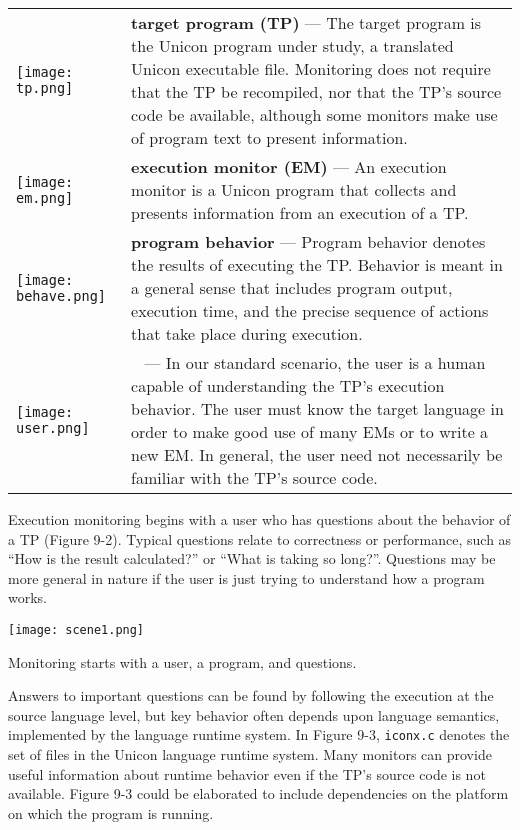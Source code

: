 \begin{tabular}{m{0.95in} m{4.75in}}
\texttt{[image: tp.png]} &
{\bf target program (TP)} ---
The target program is the Unicon program under study, a translated Unicon
executable file.
Monitoring does not require that the TP be recompiled, nor that
the TP's source code be available, although some monitors make use of
program text to present information. \index{target program!Alamo} \\
\texttt{[image: em.png]} &
{\bf execution monitor (EM)} ---
An execution monitor is a Unicon program that collects and presents
information from an execution of a TP. \index{execution monitor!Alamo} \\
\texttt{[image: behave.png]} &
{\bf program behavior} ---
Program behavior denotes the results of executing the TP.  Behavior is meant
in a general sense
that includes program output, execution time, and the precise sequence
of actions that take place during execution. \index{program behavior} \\
\texttt{[image: user.png]} &
\ \linebreak {\bf user} --- In our standard
scenario, the user is a human capable of understanding the TP's execution
behavior.  The user must know the target language in order to make good use
of many EMs or to write a new
EM.  In general, the user need not necessarily be familiar with the TP's
source code. \index{user!Alamo} \\
\end{tabular}

\bigskip

Execution monitoring begins with a user who has questions about the behavior
of a TP (Figure 9-2). Typical questions relate to correctness or performance,
such as ``How is the result calculated?'' or ``What is taking so long?''.
Questions may be more general in nature if the user is just trying to
understand how a program works.

\begin{center}
  \texttt{[image: scene1.png]}
\end{center}
\vspace{-0.25cm}{\sffamily\bfseries Figure 9-2:}
{\sffamily Monitoring starts with a user, a program, and questions.}

\bigskip

Answers to important questions can be found by following the execution at
the source language level, but key behavior often depends upon language
semantics, implemented by the language runtime system.  In Figure 9-3,
{\tt iconx.c} denotes the set of files in the Unicon language runtime
system. Many monitors can
provide useful information about runtime behavior even if the TP's source
code is not available.  Figure 9-3 could be elaborated to include
dependencies on the platform on which the program is running.

